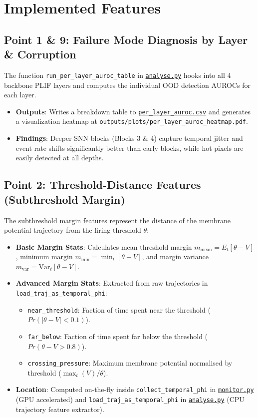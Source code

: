 \documentclass[11pt,a4paper]{article}
\begin{document}
\newpage

\section{Implemented Features}

\subsection{Point 1 \& 9: Failure Mode Diagnosis by Layer \& Corruption}
The function \texttt{run\_per\_layer\_auroc\_table} in \href{run:analyse.py}{\texttt{analyse.py}} hooks into all 4 backbone PLIF layers and computes the individual OOD detection AUROCs for each layer.
\begin{itemize}
    \item \textbf{Outputs}: Writes a breakdown table to \href{run:outputs/tables/per_layer_auroc.csv}{\texttt{per\_layer\_auroc.csv}} and generates a visualization heatmap at \texttt{outputs/plots/per\_layer\_auroc\_heatmap.pdf}.
    \item \textbf{Findings}: Deeper SNN blocks (Blocks 3 \& 4) capture temporal jitter and event rate shifts significantly better than early blocks, while hot pixels are easily detected at all depths.
\end{itemize}

\subsection{Point 2: Threshold-Distance Features (Subthreshold Margin)}
The subthreshold margin features represent the distance of the membrane potential trajectory from the firing threshold $\theta$:
\begin{itemize}
    \item \textbf{Basic Margin Stats}: Calculates mean threshold margin $m_{\text{mean}} = E_t[\theta - V]$, minimum margin $m_{\text{min}} = \min_t[\theta - V]$, and margin variance $m_{\text{var}} = \text{Var}_t[\theta - V]$.
    \item \textbf{Advanced Margin Stats}: Extracted from raw trajectories in \texttt{load\_traj\_as\_temporal\_phi}:
    \begin{itemize}
        \item \texttt{near\_threshold}: Faction of time spent near the threshold ($Pr(|\theta - V| < 0.1)$).
        \item \texttt{far\_below}: Faction of time spent far below the threshold ($Pr(\theta - V > 0.8)$).
        \item \texttt{crossing\_pressure}: Maximum membrane potential normalised by threshold ($\max_t(V) / \theta$).
    \end{itemize}
    \item \textbf{Location}: Computed on-the-fly inside \texttt{collect\_temporal\_phi} in \href{run:monitor.py}{\texttt{monitor.py}} (GPU accelerated) and \texttt{load\_traj\_as\_temporal\_phi} in \href{run:analyse.py}{\texttt{analyse.py}} (CPU trajectory feature extractor).
\end{itemize}
\end{document}
